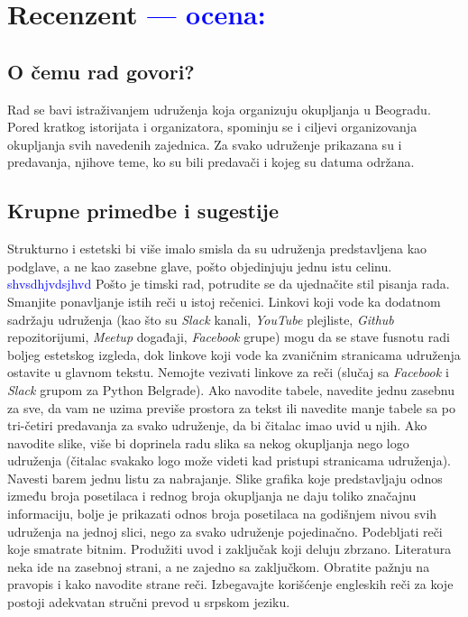 \documentclass[a4paper]{report}
\newcommand{\odgovor}[1]{\textcolor{blue}{#1}}
\begin{document}
\chapter{Recenzent \odgovor{--- ocena:} }


\section{O čemu rad govori?}
Rad se bavi istraživanjem udruženja koja organizuju okupljanja u Beogradu. 
Pored kratkog istorijata i organizatora, spominju se i ciljevi organizovanja 
okupljanja svih navedenih zajednica. Za svako udruženje prikazana su i predavanja, 
njihove teme, ko su bili predavači i kojeg su datuma održana.

\section{Krupne primedbe i sugestije}
Strukturno i estetski bi više imalo smisla da su udruženja predstavljena kao podglave, 
a ne kao zasebne glave, pošto objedinjuju jednu istu celinu. \odgovor{shvsdhjvdsjhvd}
Pošto je timski rad, potrudite se da ujednačite stil pisanja rada.
Smanjite ponavljanje istih reči u istoj rečenici.
Linkovi koji vode ka dodatnom sadržaju udruženja (kao što su \textit{Slack} kanali, \textit{YouTube} plejliste, \textit{Github} repozitorijumi, 
\textit{Meetup} događaji, \textit{Facebook} grupe) mogu da se stave fusnotu radi boljeg estetskog izgleda, dok
linkove koji vode ka zvaničnim stranicama udruženja ostavite u glavnom tekstu. 
Nemojte vezivati linkove za reči (slučaj sa \textit{Facebook} i \textit{Slack} grupom za Python Belgrade). 
Ako navodite tabele, navedite jednu zasebnu za sve, da vam ne uzima previše prostora za tekst ili
navedite manje tabele sa po tri-četiri predavanja za svako udruženje, da bi čitalac imao uvid u njih.
Ako navodite slike, više bi doprinela radu slika sa nekog okupljanja nego logo 
udruženja (čitalac svakako logo može videti kad pristupi stranicama udruženja).
Navesti barem jednu listu za nabrajanje. Slike grafika koje predstavljaju odnos između broja posetilaca
i rednog broja okupljanja ne daju toliko značajnu informaciju, bolje je prikazati odnos broja posetilaca na
godišnjem nivou svih udruženja na jednoj slici, nego za svako udruženje pojedinačno.
Podebljati reči koje smatrate bitnim. Produžiti uvod i zaključak koji deluju zbrzano. 
Literatura neka ide na zasebnoj strani, a ne zajedno sa zaključkom.
Obratite pažnju na pravopis i kako navodite strane reči.
Izbegavajte korišćenje engleskih reči za koje postoji adekvatan stručni prevod u srpskom jeziku.
\end{document}
